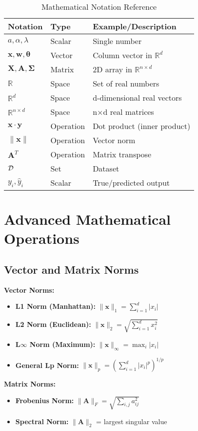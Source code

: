 \documentclass{article}
\providecommand{\vx}{\mathbf{x}}
\providecommand{\vy}{\mathbf{y}}
\providecommand{\vw}{\mathbf{w}}
\providecommand{\vtheta}{\boldsymbol{\theta}}
\providecommand{\mX}{\mathbf{X}}
\providecommand{\mA}{\mathbf{A}}
\providecommand{\mSigma}{\boldsymbol{\Sigma}}
\providecommand{\Real}{\mathbb{R}}
\begin{document}
\begin{table}[h]
\centering
\begin{tabular}{|l|l|l|}
\hline
\textbf{Notation} & \textbf{Type} & \textbf{Example/Description} \\
\hline
$a, \alpha, \lambda$ & Scalar & Single number \\
$\vx, \vw, \vtheta$ & Vector & Column vector in $\Real^d$ \\
$\mX, \mA, \mSigma$ & Matrix & 2D array in $\Real^{n \times d}$ \\
$\Real$ & Space & Set of real numbers \\
$\Real^d$ & Space & d-dimensional real vectors \\
$\Real^{n \times d}$ & Space & n×d real matrices \\
$\vx \cdot \vy$ & Operation & Dot product (inner product) \\
$\|\vx\|$ & Operation & Vector norm \\
$\mA^T$ & Operation & Matrix transpose \\
$\mathcal{D}$ & Set & Dataset \\
$y_i, \hat{y}_i$ & Scalar & True/predicted output \\
\hline
\end{tabular}
\caption{Mathematical Notation Reference}
\end{table}

\section{Advanced Mathematical Operations}

\subsection{Vector and Matrix Norms}
\textbf{Vector Norms:}
\begin{itemize}
	\item \textbf{L1 Norm (Manhattan):} $\|\vx\|_1 = \sum_{i=1}^d |x_i|$
	\item \textbf{L2 Norm (Euclidean):} $\|\vx\|_2 = \sqrt{\sum_{i=1}^d x_i^2}$
	\item \textbf{L$\infty$ Norm (Maximum):} $\|\vx\|_\infty = \max_i |x_i|$
	\item \textbf{General Lp Norm:} $\|\vx\|_p = \left(\sum_{i=1}^d |x_i|^p\right)^{1/p}$
\end{itemize}

\textbf{Matrix Norms:}
\begin{itemize}
	\item \textbf{Frobenius Norm:} $\|\mA\|_F = \sqrt{\sum_{i,j} a_{ij}^2}$
	\item \textbf{Spectral Norm:} $\|\mA\|_2$ = largest singular value
\end{itemize}
\end{document}
